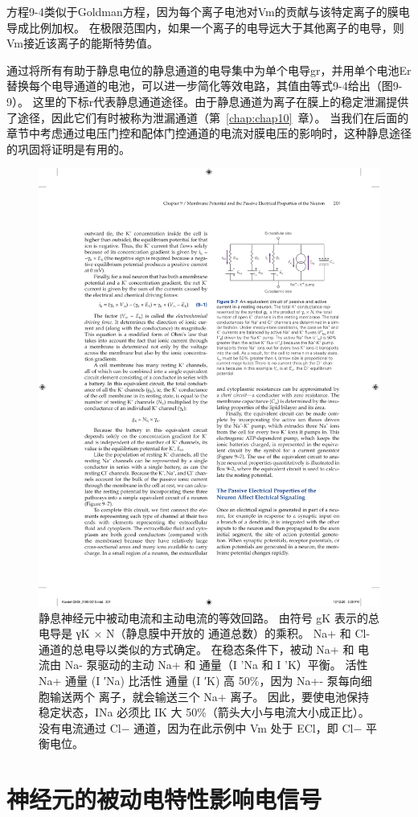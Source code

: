 \begin{proposition}[利用等效电路模型计算静息膜电位]
	\quad \quad 方程9-4类似于Goldman方程，因为每个离子电池对Vm的贡献与该特定离子的膜电导成比例加权。
	在极限范围内，如果一个离子的电导远大于其他离子的电导，则Vm接近该离子的能斯特势值。
	
	\quad \quad 通过将所有有助于静息电位的静息通道的电导集中为单个电导gr，并用单个电池Er替换每个电导通道的电池，可以进一步简化等效电路，其值由等式9-4给出（图9-9）。
	这里的下标r代表静息通道途径。由于静息通道为离子在膜上的稳定泄漏提供了途径，因此它们有时被称为泄漏通道（第~\ref{chap:chap10}~章）。
	当我们在后面的章节中考虑通过电压门控和配体门控通道的电流对膜电压的影响时，这种静息途径的巩固将证明是有用的。
	
\end{proposition}



\begin{figure}[htbp]
	\centering
	\includegraphics[width=0.5\linewidth]{chap09/fig_9_7}
	\caption{静息神经元中被动电流和主动电流的等效回路。 由符号 gK 表示的总  电导是 γK × N（静息膜中开放的  通道总数）的乘积。 Na+ 和 Cl- 通道的总电导以类似的方式确定。 在稳态条件下，被动 Na+ 和  电流由 Na- 泵驱动的主动 Na+ 和  通量（I 'Na 和 I 'K）平衡。 活性 Na+ 通量 (I ′Na) 比活性  通量 (I ′K) 高 50\%，因为 Na+- 泵每向细胞输送两个  离子，就会输送三个 Na+ 离子。 因此，要使电池保持稳定状态，INa 必须比 IK 大 50\%（箭头大小与电流大小成正比）。 没有电流通过 Cl− 通道，因为在此示例中 Vm 处于 ECl，即 Cl− 平衡电位。}
	\label{fig:9_7}
\end{figure}


\section{神经元的被动电特性影响电信号}


